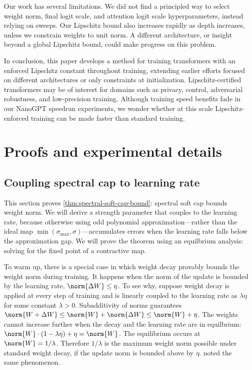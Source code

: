 Our work has several limitations. We did not find a principled way to select weight norm, final logit scale, and attention logit scale hyperparameters, instead relying on sweeps. Our Lipschitz bound also increases rapidly as depth increases, unless we constrain weights to unit norm. A different architecture, or insight beyond a global Lipschitz bound, could make progress on this problem.

In conclusion, this paper develops a method for training transformers with an enforced Lipschitz constant throughout training, extending earlier efforts focused on different architectures or only constraints at initialization. Lipschitz-certified transformers may be of interest for domains such as privacy, control, adversarial robustness, and low-precision training. Although training speed benefits fade in our NanoGPT speedrun experiments, we wonder whether at this scale Lipschitz-enforced training can be made faster than standard training.


\section{Proofs and experimental details}
\label{subsec:catch-all-appendix}


\subsection{Coupling spectral cap to learning rate}
\label{app:spectral-softcap}

This section proves \cref{thm:spectral-soft-cap-bound}: spectral soft cap bounds weight norm. We will derive a strength parameter that couples to the learning rate, because otherwise using odd polynomial approximation---rather than the ideal map $\min(\sigma_\text{max}, \sigma)$---accumulates errors when the learning rate falls below the approximation gap. We will prove the theorem using an equilbrium analysis: solving for the fixed point of a contractive map.

To warm up, there is a special case in which weight decay provably bounds the weight norm during training. It happens when the norm of the update is bounded by the learning rate, $\norm{\Delta W} \leq \eta$. To see why, suppose weight decay is applied at every step of training and is linearly coupled to the learning rate as $\lambda \eta$ for some constant $\lambda > 0$. Subadditivity of norms guarantees $\norm{W + \Delta W} \leq \norm{W} + \norm{\Delta W} \leq \norm{W} + \eta$. The weights cannot increase further when the decay and the learning rate are in equilbrium: $\norm{W} \cdot (1 - \lambda \eta) + \eta = \norm{W}$. The equilibrium occurs at $\norm{W} = 1/\lambda$. Therefore $1/\lambda$ is the maximum weight norm possible under standard weight decay, if the update norm is bounded above by $\eta$. \citet{pethick2025trainingdeeplearningmodels} noted the same phenomenon.

